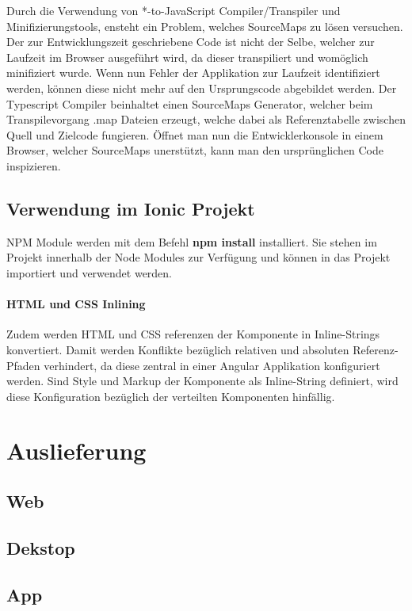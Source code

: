 Durch die Verwendung von *-to-JavaScript Compiler/Transpiler und Minifizierungstools, ensteht ein Problem, welches SourceMaps zu lösen versuchen.
Der zur Entwicklungszeit geschriebene Code ist nicht der Selbe, welcher zur Laufzeit im Browser ausgeführt wird, da dieser transpiliert und womöglich minifiziert wurde.
Wenn nun Fehler der Applikation zur Laufzeit identifiziert werden, können diese nicht mehr auf den Ursprungscode abgebildet werden.
Der Typescript Compiler beinhaltet einen SourceMaps Generator, welcher beim Transpilevorgang .map Dateien erzeugt,
welche dabei als Referenztabelle zwischen Quell und Zielcode fungieren.
Öffnet man nun die Entwicklerkonsole in einem Browser, welcher SourceMaps unerstützt, kann man den ursprünglichen Code inspizieren.
\cite{Using97:online}



\subsection{Verwendung im Ionic Projekt}

\ac{NPM} Module werden mit dem Befehl \textbf{npm install} installiert.
Sie stehen im Projekt innerhalb der Node Modules zur Verfügung und können in das Projekt importiert und verwendet werden.




\paragraph{HTML und CSS Inlining}
Zudem werden \ac{HTML} und \ac{CSS} referenzen der Komponente in Inline-Strings konvertiert.
Damit werden Konflikte bezüglich relativen und absoluten Referenz-Pfaden verhindert,
da diese zentral in einer Angular Applikation konfiguriert werden.
Sind Style und Markup der Komponente als Inline-String definiert,
wird diese Konfiguration bezüglich der verteilten Komponenten hinfällig.
\cite{ludoh30:online}

\section{Auslieferung}
\subsection{Web}
\subsection{Dekstop}
\subsection{App}
